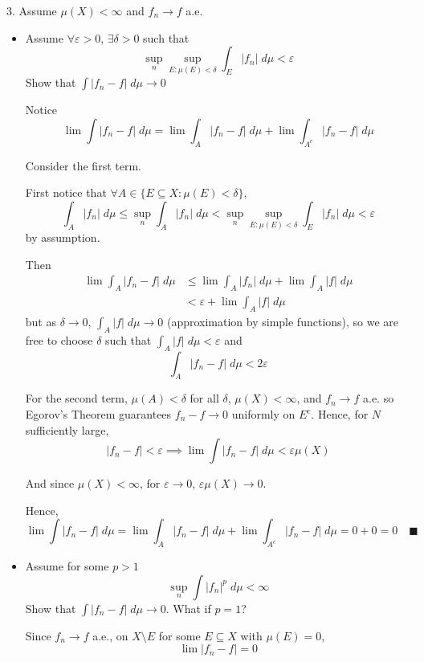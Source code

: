 \documentclass[12pt]{article}
\newcommand{\qed}{\quad \blacksquare}
\newcommand{\abs}[1]{\left\vert #1 \right\vert}
\newcommand{\ep}{\varepsilon}
\newcommand{\sub}{\subseteq}
\begin{document}
3. Assume $\mu(X) < \infty$ and $f_n \to f$ a.e. 
\begin{itemize}
    \item Assume $\forall \ep >0$, $\exists \delta > 0$ such that 
    \[\sup_n \sup_{E: \mu(E) < \delta} \int_E \abs{f_n} \; d\mu < \ep\]
    Show that $\int \abs{f_n - f} \; d\mu \to 0$

    \color{blue}
        Notice 
        \[\lim \int \abs{f_n - f} \; d\mu = \lim \int_A \abs{f_n  -f} \; d\mu + \lim \int_{A^c} \abs{f_n - f} \; d\mu\]

        Consider the first term.

        First notice that $\forall A \in \{E \sub X: \mu(E) < \delta\}$,
        \[\int_A \abs{f_n} \; d\mu \leq \sup_n \int_A \abs{f_n} \; d\mu<  \sup_n \sup_{E: \mu(E) < \delta} \int_E \abs{f_n} \; d\mu < \ep\]
        by assumption. 

        Then 
        \begin{align*}
            \lim \int_A \abs{f_n - f} \; d\mu &\leq \lim \int_A \abs{f_n} \; d\mu + \lim \int_A \abs{f} \; d\mu\\ 
            &< \ep + \lim \int_A \abs{f} \; d\mu
        \end{align*}
        but as $\delta \to 0$, $\int_A \abs{f} \; d\mu \to 0$ (approximation by simple functions), so we are free to choose $\delta$ such that $\int_A \abs{f} \; d\mu < \ep$ and 
        \[\int_A \abs{f_n - f} \; d\mu < 2\ep\]

        For the second term, $\mu(A) < \delta$ for all $\delta$, $\mu(X) < \infty$, and $f_n \to f$ a.e. so Egorov's Theorem guarantees $f_n - f \to 0$ uniformly on $E^c$. Hence, for $N$ sufficiently large, 
        \[\abs{f_n - f} < \ep \implies \lim \int \abs{f_n - f} \; d\mu < \ep \mu(X)\]
        
        And since $\mu(X) < \infty$, for $\ep \to 0$, $\ep \mu(X) \to 0$. 

        Hence, 
        \[\lim \int \abs{f_n - f} \; d\mu = \lim \int_A \abs{f_n  -f} \; d\mu + \lim \int_{A^c} \abs{f_n - f} \; d\mu = 0 + 0 = 0 \qed\]
        
    \color{black}


    \item Assume for some $p > 1$ 
    \[\sup_n \int \abs{f_n}^p \; d\mu < \infty\]
    Show that $\int \abs{f_n - f} \; d\mu \to 0$. What if $p = 1$? 

    \color{blue}
      
        Since $f_n \to f$ a.e., on $X \setminus E$ for some $E \sub X$ with $\mu(E) = 0$, 
        \[\lim \abs{f_n - f} = 0\]
        

\end{itemize}
\end{document}
